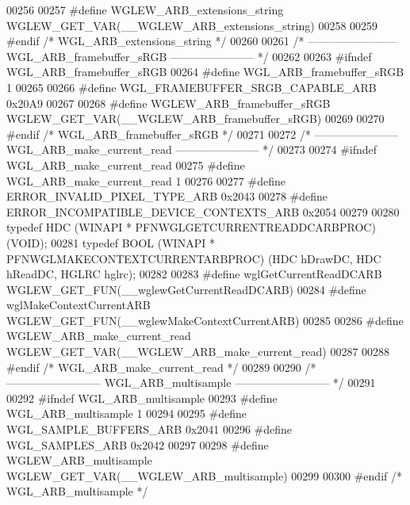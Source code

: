 \begin{DoxyCode}
00256 
00257 \textcolor{preprocessor}{#define WGLEW\_ARB\_extensions\_string WGLEW\_GET\_VAR(\_\_WGLEW\_ARB\_extensions\_string)}
00258 
00259 \textcolor{preprocessor}{#endif }\textcolor{comment}{/* WGL\_ARB\_extensions\_string */}\textcolor{preprocessor}{}
00260 
00261 \textcolor{comment}{/* ------------------------ WGL\_ARB\_framebuffer\_sRGB ----------------------- */}
00262 
00263 \textcolor{preprocessor}{#ifndef WGL\_ARB\_framebuffer\_sRGB}
00264 \textcolor{preprocessor}{#define WGL\_ARB\_framebuffer\_sRGB 1}
00265 
00266 \textcolor{preprocessor}{#define WGL\_FRAMEBUFFER\_SRGB\_CAPABLE\_ARB 0x20A9}
00267 
00268 \textcolor{preprocessor}{#define WGLEW\_ARB\_framebuffer\_sRGB WGLEW\_GET\_VAR(\_\_WGLEW\_ARB\_framebuffer\_sRGB)}
00269 
00270 \textcolor{preprocessor}{#endif }\textcolor{comment}{/* WGL\_ARB\_framebuffer\_sRGB */}\textcolor{preprocessor}{}
00271 
00272 \textcolor{comment}{/* ----------------------- WGL\_ARB\_make\_current\_read ----------------------- */}
00273 
00274 \textcolor{preprocessor}{#ifndef WGL\_ARB\_make\_current\_read}
00275 \textcolor{preprocessor}{#define WGL\_ARB\_make\_current\_read 1}
00276 
00277 \textcolor{preprocessor}{#define ERROR\_INVALID\_PIXEL\_TYPE\_ARB 0x2043}
00278 \textcolor{preprocessor}{#define ERROR\_INCOMPATIBLE\_DEVICE\_CONTEXTS\_ARB 0x2054}
00279 
00280 \textcolor{keyword}{typedef} HDC (WINAPI * PFNWGLGETCURRENTREADDCARBPROC) (VOID);
00281 \textcolor{keyword}{typedef} BOOL (WINAPI * PFNWGLMAKECONTEXTCURRENTARBPROC) (HDC hDrawDC, HDC 
      hReadDC, HGLRC hglrc);
00282 
00283 \textcolor{preprocessor}{#define wglGetCurrentReadDCARB WGLEW\_GET\_FUN(\_\_wglewGetCurrentReadDCARB)}
00284 \textcolor{preprocessor}{#define wglMakeContextCurrentARB WGLEW\_GET\_FUN(\_\_wglewMakeContextCurrentARB)}
00285 
00286 \textcolor{preprocessor}{#define WGLEW\_ARB\_make\_current\_read WGLEW\_GET\_VAR(\_\_WGLEW\_ARB\_make\_current\_read)}
00287 
00288 \textcolor{preprocessor}{#endif }\textcolor{comment}{/* WGL\_ARB\_make\_current\_read */}\textcolor{preprocessor}{}
00289 
00290 \textcolor{comment}{/* -------------------------- WGL\_ARB\_multisample -------------------------- */}
00291 
00292 \textcolor{preprocessor}{#ifndef WGL\_ARB\_multisample}
00293 \textcolor{preprocessor}{#define WGL\_ARB\_multisample 1}
00294 
00295 \textcolor{preprocessor}{#define WGL\_SAMPLE\_BUFFERS\_ARB 0x2041}
00296 \textcolor{preprocessor}{#define WGL\_SAMPLES\_ARB 0x2042}
00297 
00298 \textcolor{preprocessor}{#define WGLEW\_ARB\_multisample WGLEW\_GET\_VAR(\_\_WGLEW\_ARB\_multisample)}
00299 
00300 \textcolor{preprocessor}{#endif }\textcolor{comment}{/* WGL\_ARB\_multisample */}\textcolor{preprocessor}{}

\end{DoxyCode}
